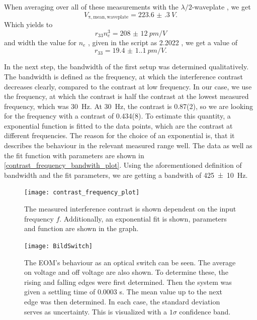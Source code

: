 When averaging over all of these measurements with the $\lambda/2$-waveplate , we get
$$V_{\mathrm{\pi, mean, waveplate}}=\SI{223.6(3)}{V}.$$
Which yields to
$$r_{33}n_e^3=\SI{208(12)}{pm/V}$$
and width the value for $n_e$ , given in the script as 2.2022 \autocite{eom}, we get a value of $$r_{33}=\SI{19.4(1.1)}{pm/V}.$$






In the next step, the bandwidth of the first setup was determined qualitatively. The bandwidth is defined as the frequency, at which the interference contrast decreases clearly, compared to the contrast at low frequency. In our case, we use the frequency, at which the contrast is half the contrast at the lowest measured frequency, which was \SI{30}{Hz}. At \SI{30}{Hz}, the contrast is 0.87(2), so we are looking for the frequency with a contrast of 0.434(8). To estimate this quantity, a exponential function is fitted to the data points, which are the contrast at different frequencies. The reason for the choice of an exponential is, that it describes the behaviour in the relevant measured range well. The data as well as the fit function with parameters are shown in \autoref{contrast_frequency_bandwith_plot}. Using the aforementioned definition of bandwidth and the fit parameters, we are getting a bandwith of \SI{425(10)}{Hz}. 

\begin{figure}[H]
	\centering
	\texttt{[image: contrast\_frequency\_plot]}
	\caption{The measured interference contrast is shown dependent on the input frequency $f$. Additionally, an exponential fit is shown, parameters and function are shown in the graph. }
	\label{contrast_frequency_bandwith_plot}
\end{figure}
\begin{figure}[H]
	\centering
	\texttt{[image: BildSwitch]}
	\caption{The EOM's behaviour as an optical switch can be seen. The average on voltage and off voltage are also shown. To determine these, the rising and falling edges were first determined. Then the system was given a settling time of 0.0003 s. The mean value up to the next edge was then determined. In each case, the standard deviation serves as uncertainty. This is visualized with a $1\sigma$ confidence band.}
	\label{fig:Switch}
\end{figure}




